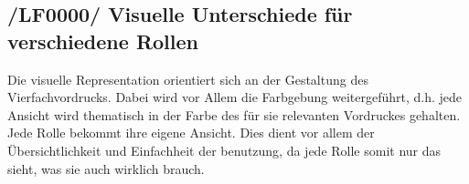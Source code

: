\subsection{/LF0000/ Visuelle Unterschiede für verschiedene Rollen}
Die visuelle Representation orientiert sich an der Gestaltung des Vierfachvordrucks. Dabei wird vor Allem die Farbgebung weitergeführt,   
d.h. jede Ansicht wird thematisch in der Farbe des für sie relevanten Vordruckes gehalten. Jede Rolle bekommt ihre eigene Ansicht.  
Dies dient vor allem der Übersichtlichkeit und Einfachheit der benutzung, da jede Rolle somit nur das sieht, was sie auch wirklich brauch.  


